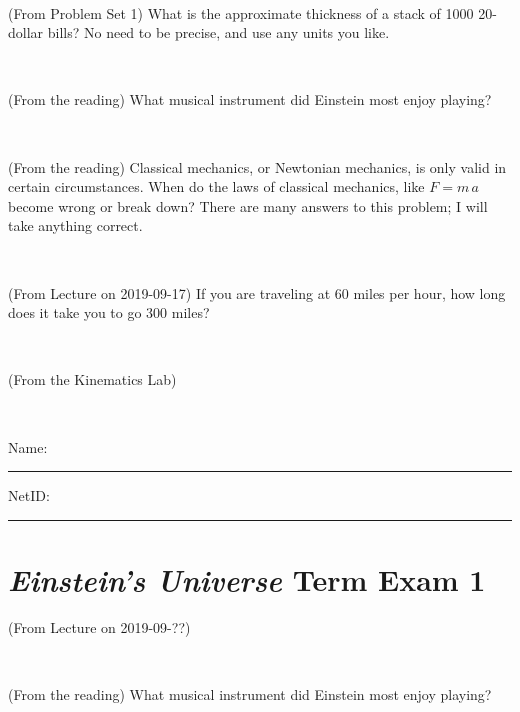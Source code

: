 \documentclass[12pt, letterpaper]{article}
\begin{document}
\vfill ~

\begin{problem} (From Problem Set 1)
What is the approximate thickness of a stack of 1000 20-dollar bills?
No need to be precise, and use any units you like.
\end{problem}


\vfill ~


\clearpage


\begin{problem} (From the reading)
What musical instrument did Einstein most enjoy playing?
\end{problem}


\vfill ~

\begin{problem} (From the reading)
Classical mechanics, or Newtonian mechanics, is only valid in certain
circumstances. When do the laws of classical mechanics, like $F =
m\,a$ become wrong or break down? There are many answers to this
problem; I will take anything correct.
\end{problem}


\vfill ~

\begin{problem} (From Lecture on 2019-09-17)
If you are traveling at 60 miles per hour, how long does
it take you to go 300 miles?
\end{problem}


\vfill ~

\begin{problem} (From the Kinematics Lab)

\end{problem}


\vfill ~


\cleardoublepage



\noindent
Name: \rule[-1ex]{0.60\textwidth}{0.1pt}
NetID: \rule[-1ex]{0.20\textwidth}{0.1pt}

\section*{\textsl{Einstein's Universe} Term Exam 1}
\setcounter{problem}{1}


\begin{problem} (From Lecture on 2019-09-??)
\end{problem}


\vfill ~

\begin{problem} (From the reading)
What musical instrument did Einstein most enjoy playing?
\end{problem}
\end{document}
